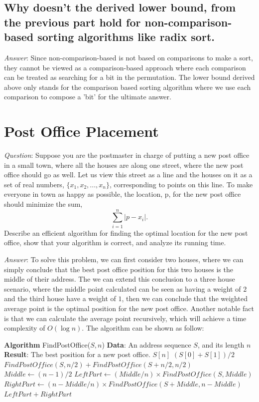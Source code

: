 \documentclass[11pt]{article}
\begin{document}
\subsection{Why doesn't the derived lower bound, from the previous part hold for non-comparison-based sorting algorithms like radix sort.}
\noindent \emph{Answer}: Since non-comparison-based is not based on comparisons to make a sort, they cannot be viewed as a comparison-based approach where each comparison can be treated as searching for a bit in the permutation. The lower bound derived above only stands for the comparison based sorting algorithm where we use each comparison to compose a 'bit' for the ultimate answer.
\section{Post Office Placement}
\noindent \emph{Question}: Suppose you are the postmaster in charge of putting a new post office in a small town, where all the houses are along one street, where the new post office should go as well. Let us view this street as a line and the houses on it as a set of real numbers, $\{x_1, x_2, . . . , x_n\}$, corresponding to points on this line. To make everyone in town as happy as possible, the location, p, for the new post office should minimize the sum,
\begin{equation*}
	\sum_{i=1}^{n} |p-x_i|.
\end{equation*}
Describe an efficient algorithm for finding the optimal location for the new post office, show that your algorithm is correct, and analyze its running time.

\noindent \emph{Answer}: To solve this problem, we can first consider two houses, where we can simply conclude that the best post office position for this two houses is the middle of their address. The we can extend this conclusion to a three house scenario, where the middle point calculated can be seen as having a weight of $2$ and the third house have a weight of $1$, then we can conclude that the weighted average point is the optimal position for the new post office. Another notable fact is that we can calculate the average point recursively, which will achieve a time complexity of $O(\log n)$. The algorithm can be shown as follow:
\begin{algorithmic}
	\State \textbf{Algorithm} FindPostOffice($S,n$)
	\State \textbf{Data}: An address sequence $S$, and its length $n$
	\State \textbf{Result}: The best position for a new post office.
		\State \Return $S[n]$
	\EndIf
		\State \Return $(S[0]+S[1])/2$
	\EndIf
		\State \Return $FindPostOffice(S,n/2)+FindPostOffice(S+n/2,n/2)$
	\Else
		\State $Middle\gets (n-1)/2$
		\State $LeftPart \gets (Middle/n)\times FindPostOffice(S,Middle)$
		\State $RightPart \gets (n-Middle/n)\times FindPostOffice(S+Middle,n-Middle)$
		\State \Return $LeftPart+RightPart$
	\EndIf
\end{algorithmic}
\end{document}
